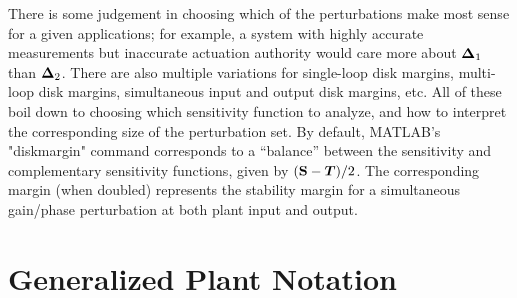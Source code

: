 There is some judgement in choosing which of the perturbations make most sense for a given applications; for example, a system with highly accurate measurements but inaccurate actuation authority would care more about $\vb*{\Delta}_{1}$ than $\vb*{\Delta}_{2}$.  There are also multiple variations for single-loop disk margins, multi-loop disk margins, simultaneous input and output disk margins, etc.  All of these boil down to choosing which sensitivity function to analyze, and how to interpret the corresponding size of the perturbation set.  By default, MATLAB's "diskmargin" command corresponds to a ``balance'' between the sensitivity and complementary sensitivity functions, given by $(\vb{S} - \vb*{T})/2$.  The corresponding margin (when doubled) represents the stability margin for a simultaneous gain/phase perturbation at both plant input and output.

\section{Generalized Plant Notation}
